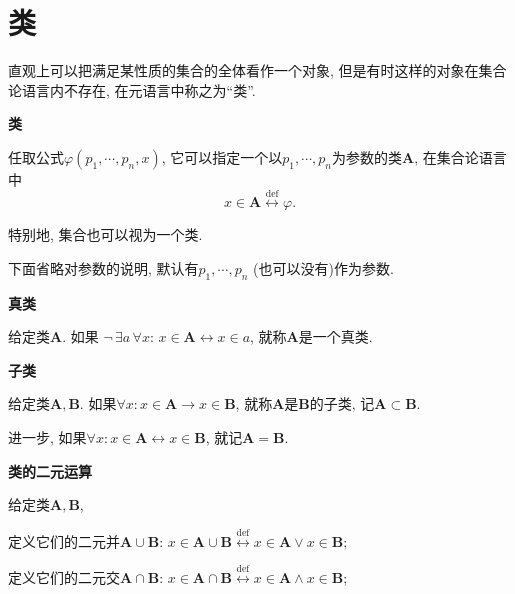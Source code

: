 \documentclass[UTF8]{ctexart}
\begin{document}
\setlength{\abovedisplayskip}{1pt}
\setlength{\belowdisplayskip}{1pt}

\section*{类}

直观上可以把满足某性质的集合的全体看作一个对象, 但是有时这样的对象在集合论语言内不存在,
在元语言中称之为``类''.

\vspace{10pt}

\hypertarget{sec:类}{}
\noindent\textbf{类}

任取公式$\varphi(p_1,\cdots,p_n,x)$,
它可以指定一个以$p_1,\cdots,p_n$为参数的类$\mathbf{A}$, 在集合论语言中
\vspace{3pt}
\[
    x\in\mathbf{A}\overset{\mathrm{def}}{\leftrightarrow}\varphi.
\]

特别地, 集合也可以视为一个类.

\vspace{10pt}

下面省略对参数的说明, 默认有$p_1,\cdots,p_n$ (也可以没有)作为参数.

\vspace{10pt}

\hypertarget{sec:真类}{}
\noindent\textbf{真类}

给定类$\mathbf{A}$. 如果
$\neg\,\exists a\,\forall x:\,x\in\mathbf{A}\leftrightarrow x\in a$,
就称$\mathbf{A}$是一个真类.

\vspace{10pt}

\hypertarget{sec:子类}{}
\noindent\textbf{子类}

给定类$\mathbf{A},\mathbf{B}$. 如果$\forall x:x\in\mathbf{A}\to x\in\mathbf{B}$,
就称$\mathbf{A}$是$\mathbf{B}$的子类, 记$\mathbf{A}\subset\mathbf{B}$.

进一步, 如果$\forall x:x\in\mathbf{A}\leftrightarrow x\in\mathbf{B}$,
就记$\mathbf{A}=\mathbf{B}$.

\vspace{10pt}

\hypertarget{sec:类的二元运算}{}
\noindent\textbf{类的二元运算}

给定类$\mathbf{A},\mathbf{B}$,

定义它们的二元并$\mathbf{A}\cup\mathbf{B}$:
$x\in\mathbf{A}\cup\mathbf{B}\overset{\mathrm{def}}{\leftrightarrow}
x\in\mathbf{A}\lor x\in\mathbf{B}$;

定义它们的二元交$\mathbf{A}\cap\mathbf{B}$:
$x\in\mathbf{A}\cap\mathbf{B}\overset{\mathrm{def}}{\leftrightarrow}
x\in\mathbf{A}\land x\in\mathbf{B}$;
\end{document}
